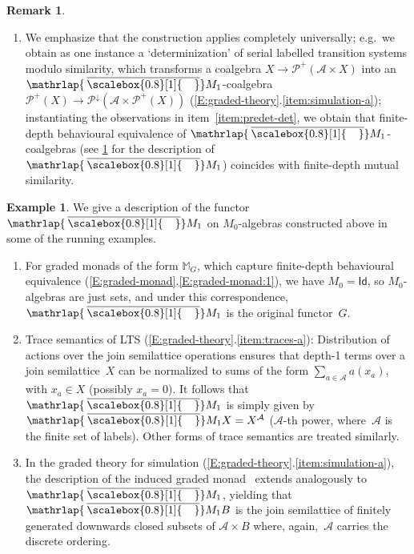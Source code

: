 \documentclass[sigconf,
			final%
			nonacm
                        ]{acmart}
\numberwithin{equation}{section}
\numberwithin{equation}{section}
\theoremstyle{plain}
\theoremstyle{definition}
\newtheorem{expl}[thm]{Example}
\newtheorem{rem}[thm]{Remark}
\newcommand{\mybar}[3]{%
  \mathrlap{\hspace{#2}\overline{\scalebox{#1}[1]{\hphantom{\ensuremath{#3}}\vphantom{\rule{0pt}{5.5pt}}}}}\ensuremath{#3}
}
\newcommand{\barM}{\mybar{0.8}{2pt}{M}_1}
\newcommand{\id}{\mathsf{id}}
\newcommand{\M}{\mathbb{M}}                   %
\newcommand{\A}{\mathcal{A}}            %
\newcommand{\Id}{\mathsf{Id}}                 %
\newcommand{\pow}{\mathscr P}              %
\begin{document}
\begin{rem}
\begin{enumerate}
    To view this as an instance of pre-de\-ter\-mi\-ni\-za\-tion, take
    the graded monad with $M_n = F^nT$
    (\cref{E:graded-monad}.\ref{E:graded-monad:4}), let $G = FT$,
    and let $\alpha = \id_{FT}$. Using~\eqref{Eq:determinization}, we
    see that $(\alpha_X \cdot \gamma)^\#$ in~\eqref{eq:det} is the
    generalized determinization $\gamma^\sharp$ above.
  \item We emphasize that the construction applies completely
    universally; e.g.~we obtain as one instance a `determinization' of
    serial labelled transition systems modulo similarity, which
    transforms a coalgebra $X\to\pow^+(\A\times X)$ into an
    $\barM$-coalgebra
    $\pow^+(X)\to\pow^{\downarrow}(\A\times \pow^+(X))$
    (\cref{E:graded-theory}.\ref{item:simulation-a}); instantiating
    the observations in item~\ref{item:predet-det}, we obtain that
    finite-depth behavioural equivalence of $\barM$-coalgebras (see
    \cref{expl:barM} for the description of~$\barM$) coincides with
    finite-depth mutual similarity.
  \end{enumerate}
\end{rem}

\begin{expl}\label{expl:barM}
  We give a description of the functor~$\barM$ on $M_0$-algebras
  constructed above in some of the running examples.
  \begin{enumerate}[wide]
  \item For graded monads of the form $\M_G$, which capture
    finite-depth behavioural equivalence
    (\cref{E:graded-monad}.\ref{E:graded-monad:1}), we have
    $M_0=\Id$, so $M_0$-algebras are just sets, and under this
    correspondence, $\barM$ is the original functor~$G$.

  \item\label{item:mono-traces} Trace semantics of LTS
    (\cref{E:graded-theory}.\ref{item:traces-a}): Distribution of
    actions over the join semilattice operations ensures that depth-1
    terms over a join semilattice~$X$ can be normalized to sums of the
    form $\sum_{a\in \A}a(x_a)$, with $x_a\in X$ (possibly
    $x_a=0$). It follows that $\barM$ is simply given by
    $\barM X=X^\A$ ($\A$-th power, where~$\A$ is the finite set of labels).
    Other forms of trace semantics are treated similarly. %
  \item In the graded theory for simulation
    (\cref{E:graded-theory}.\ref{item:simulation-a}), the
    description of the induced graded monad~\cite{DMS19} extends
    analogously to~$\barM$, yielding that $\barM B$ is the join
    semilattice of finitely generated downwards closed subsets of
    $\A\times B$ where, again,~$\A$ carries the discrete
    ordering.
  \end{enumerate}
\end{expl}
\end{document}

